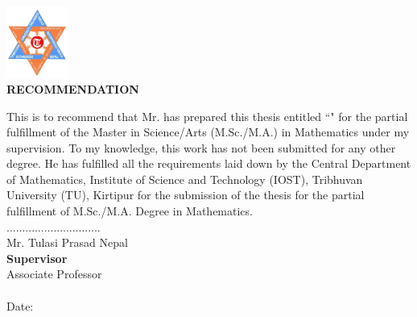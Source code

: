 
\vspace{-1cm}
\begin{center}
	\includegraphics[width=0.15\textwidth]{pictures/tulogo.png}\\[1.5cm]
	{\Large{\bfseries{RECOMMENDATION}}}\\[.5cm]
      \end{center}

This is to recommend that Mr. \textbf{\theauthor} has prepared this thesis entitled ``\textbf{\thetitle}" for the partial fulfillment of the Master in Science/Arts (M.Sc./M.A.) in Mathematics under my supervision. To my knowledge, this work has not been submitted for any other degree.
He has fulfilled all the requirements laid down by the Central Department of Mathematics, Institute of Science and Technology (IOST), Tribhuvan University (TU), Kirtipur for the submission of the thesis for the partial fulfillment of M.Sc./M.A. Degree in Mathematics.\\

\vspace{1.5cm}
\noindent
..............................\\
Mr. Tulasi Prasad Nepal\\
\textbf {Supervisor}\\
Associate Professor\\ \\
Date: \thedate

\clearpage